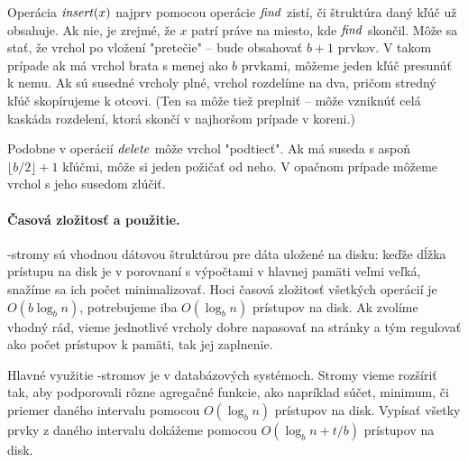 Operácia $\mathop{\mathit{insert}}(x)$ najprv pomocou operácie $\mathop{\mathit{find}}$ zistí, či štruktúra daný kľúč už obsahuje.
Ak nie, je zrejmé, že $x$ patrí práve na miesto, kde $\mathop{\mathit{find}}$ skončil.
Môže sa stať, že vrchol po vložení "pretečie" -- bude obsahovať $b+1$ prvkov. V takom prípade
ak má vrchol brata s menej ako $b$ prvkami, môžeme jeden kľúč presunúť k nemu.
Ak sú susedné vrcholy plné, vrchol rozdelíme na dva, pričom stredný kľúč skopírujeme
k otcovi. (Ten sa môže tiež preplniť -- môže vzniknúť celá kaskáda rozdelení, ktorá skončí
v najhoršom prípade v koreni.)

Podobne v operácií $\mathop{\mathit{delete}}$ môže vrchol "podtiecť". Ak má suseda s aspoň $\lfloor b/2 \rfloor+1$
kľúčmi, môže si jeden požičať od neho. V opačnom prípade môžeme vrchol s jeho susedom zlúčiť.

\paragraph{Časová zložitosť a použitie.}
\Bp-stromy sú vhodnou dátovou štruktúrou pre dáta uložené na disku: keďže dĺžka prístupu na
disk je v porovnaní s výpočtami v hlavnej pamäti veľmi veľká, snažíme sa ich počet minimalizovať.
Hoci časová zložitosť všetkých operácií je $O(b\log_b n)$, potrebujeme iba $O(\log_b n)$ prístupov
na disk. Ak zvolíme vhodný rád, vieme jednotlivé vrcholy dobre napasovať na stránky a tým regulovať
ako počet prístupov k pamäti, tak jej zaplnenie.

Hlavné využitie \Bp-stromov je v databázových systémoch. Stromy vieme rozšíriť tak, aby podporovali
rôzne agregačné funkcie, ako napríklad súčet, minimum, či priemer daného intervalu pomocou $O(\log_b n)$
prístupov na disk. Vypísať všetky prvky z daného intervalu dokážeme pomocou $O(\log_b n + t/b)$ prístupov na disk.

